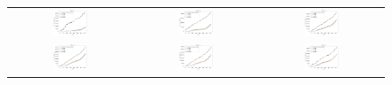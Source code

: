 \documentclass[preprintm,linenumbers]{aastex631}
\begin{document}
    \begin{figure}
			\centering
			\begin{tabular}{c c c}
				\includegraphics[width=0.3\textwidth]{results/first_year_one_snap_v4_0_10yrs_db_noDD_noTwi_cum_baseline_u.pdf} &
				\includegraphics[width=0.3\textwidth]{results/first_year_one_snap_v4_0_10yrs_db_noDD_noTwi_cum_baseline_g.pdf} &
				\includegraphics[width=0.3\textwidth]{results/first_year_one_snap_v4_0_10yrs_db_noDD_noTwi_cum_baseline_r.pdf} \\
				\includegraphics[width=0.3\textwidth]{results/first_year_one_snap_v4_0_10yrs_db_noDD_noTwi_cum_baseline_i.pdf} &
				\includegraphics[width=0.3\textwidth]{results/first_year_one_snap_v4_0_10yrs_db_noDD_noTwi_cum_baseline_z.pdf} &
				\includegraphics[width=0.3\textwidth]{results/first_year_one_snap_v4_0_10yrs_db_noDD_noTwi_cum_baseline_y.pdf}
			\end{tabular}
			

\end{figure}
\end{document}
